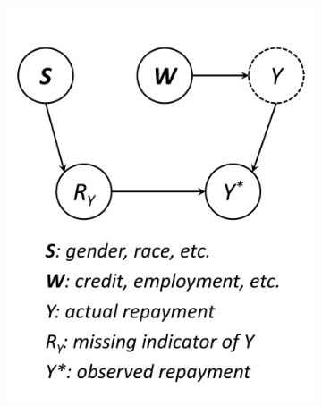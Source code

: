 \documentclass[11pt]{article}
\begin{document}
\begin{figure}[t]
\centering
\begin{subfigure}[b]{0.24\textwidth}
   \includegraphics[width=\linewidth]{submissions/submission5/figs/missing-value.pdf}
   \vspace{-.5cm}
   \caption{}
   \label{fig:missing-value}
\end{subfigure}
\hfill
\begin{subfigure}[b]{0.24\textwidth}

\end{subfigure}
\end{figure}
\end{document}
